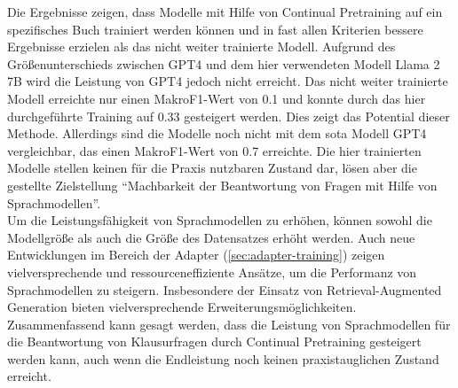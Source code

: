 Die Ergebnisse zeigen, dass Modelle mit Hilfe von Continual Pretraining auf ein spezifisches Buch trainiert werden können und in fast allen Kriterien bessere Ergebnisse erzielen als das nicht weiter trainierte Modell.
Aufgrund des Größenunterschieds zwischen GPT4 und dem hier verwendeten Modell Llama 2 7B wird die Leistung von GPT4 jedoch nicht erreicht.
Das nicht weiter trainierte Modell erreichte nur einen MakroF1-Wert von \num{0.1} und konnte durch das hier durchgeführte Training auf \num{0.33} gesteigert werden.
Dies zeigt das Potential dieser Methode.
Allerdings sind die Modelle noch nicht mit dem \ac{sota} Modell GPT4 vergleichbar, das einen MakroF1-Wert von \num{0.7} erreichte.
Die hier trainierten Modelle stellen keinen für die Praxis nutzbaren Zustand dar, lösen aber die gestellte Zielstellung \enquote{Machbarkeit der Beantwortung von Fragen mit Hilfe von Sprachmodellen}.\\

Um die Leistungsfähigkeit von Sprachmodellen zu erhöhen, können sowohl die Modellgröße als auch die Größe des Datensatzes erhöht werden.
Auch neue Entwicklungen im Bereich der Adapter (\cref{sec:adapter-training}) zeigen vielversprechende und ressourceneffiziente Ansätze, um die Performanz von Sprachmodellen zu steigern.
Insbesondere der Einsatz von Retrieval-Augmented Generation bieten vielversprechende Erweiterungsmöglichkeiten.\\

Zusammenfassend kann gesagt werden, dass die Leistung von Sprachmodellen für die Beantwortung von Klausurfragen durch Continual Pretraining gesteigert werden kann, auch wenn die Endleistung noch keinen praxistauglichen Zustand erreicht.\\

\vfill
